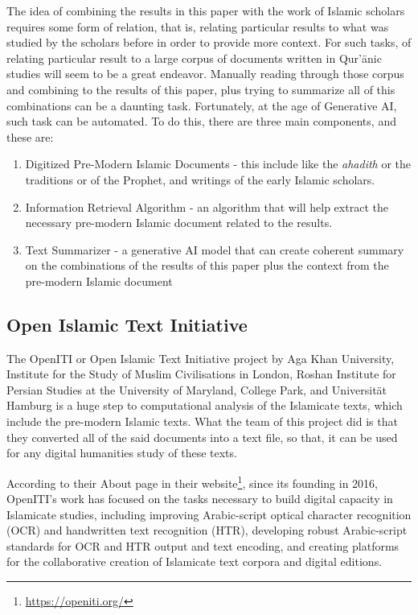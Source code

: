 The idea of combining the results in this paper with the work of Islamic scholars requires some form of relation, that is, relating particular results to what was studied by the scholars before in order to provide more context. For such tasks, of relating particular result to a large corpus of documents written in Qur'\=anic studies will seem to be a great endeavor. Manually reading through those corpus and combining to the results of this paper, plus trying to summarize all of this combinations can be a daunting task. Fortunately, at the age of Generative AI, such task can be automated. To do this, there are three main components, and these are: 
\begin{enumerate}
    \item Digitized Pre-Modern Islamic Documents - this include like the \textit{ahadith} or the traditions or   of the Prophet, and writings of the early Islamic scholars.
    \item Information Retrieval Algorithm - an algorithm that will help extract the necessary pre-modern Islamic document related to the results.
    \item Text Summarizer - a generative AI model that can create coherent summary on the combinations of the results of this paper plus the context from the pre-modern Islamic document
\end{enumerate}
\subsection{Open Islamic Text Initiative}
The OpenITI or Open Islamic Text Initiative project by Aga Khan University, Institute for the Study of Muslim Civilisations in London, Roshan Institute for Persian Studies at the University of Maryland, College Park, and Universität Hamburg is a huge step to computational analysis of the Islamicate texts, which include the pre-modern Islamic texts. What the team of this project did is that they converted all of the said documents into a text file, so that, it can be used for any digital humanities study of these texts.

According to their About page in their website\footnote{\url{https://openiti.org/}}, since its founding in 2016, OpenITI's work has focused on the tasks necessary to build digital capacity in Islamicate studies, including improving Arabic-script optical character recognition (OCR) and handwritten text recognition (HTR), developing robust Arabic-script standards for OCR and HTR output and text encoding, and creating platforms for the collaborative creation of Islamicate text corpora and digital editions.

